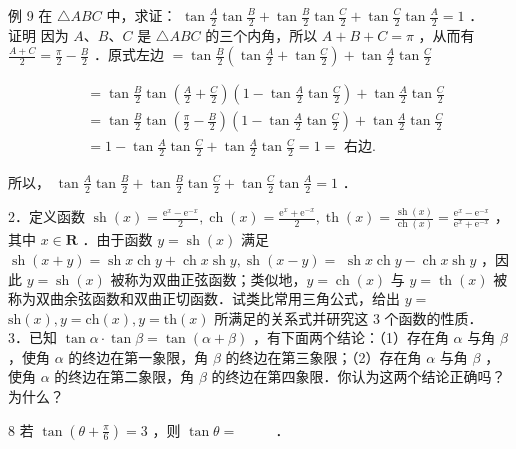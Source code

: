 \documentclass[10pt]{article}
\begin{document}
例 9 在 \(\triangle A B C\) 中，求证： \(\tan \frac{A}{2} \tan \frac{B}{2}+\tan \frac{B}{2} \tan \frac{C}{2}+\tan \frac{C}{2} \tan \frac{A}{2}=1\) ．\\
证明 因为 \(A 、 B 、 C\) 是 \(\triangle A B C\) 的三个内角，所以 \(A+B+C=\pi\) ，从而有 \(\frac{A+C}{2}=\frac{\pi}{2}-\frac{B}{2}\) ．原式左边 \(=\tan \frac{B}{2}\left(\tan \frac{A}{2}+\tan \frac{C}{2}\right)+\tan \frac{A}{2} \tan \frac{C}{2}\)

\[
\begin{aligned}
& =\tan \frac{B}{2} \tan \left(\frac{A}{2}+\frac{C}{2}\right)\left(1-\tan \frac{A}{2} \tan \frac{C}{2}\right)+\tan \frac{A}{2} \tan \frac{C}{2} \\
& =\tan \frac{B}{2} \tan \left(\frac{\pi}{2}-\frac{B}{2}\right)\left(1-\tan \frac{A}{2} \tan \frac{C}{2}\right)+\tan \frac{A}{2} \tan \frac{C}{2} \\
& =1-\tan \frac{A}{2} \tan \frac{C}{2}+\tan \frac{A}{2} \tan \frac{C}{2}=1=\text { 右边. }
\end{aligned}
\]

所以， \(\tan \frac{A}{2} \tan \frac{B}{2}+\tan \frac{B}{2} \tan \frac{C}{2}+\tan \frac{C}{2} \tan \frac{A}{2}=1\) ．

2．定义函数 \(\operatorname{sh}(x)=\frac{\mathrm{e}^{x}-\mathrm{e}^{-x}}{2}, \operatorname{ch}(x)=\frac{\mathrm{e}^{x}+\mathrm{e}^{-x}}{2}, \operatorname{th}(x)=\frac{\operatorname{sh}(x)}{\operatorname{ch}(x)}=\frac{\mathrm{e}^{x}-\mathrm{e}^{-x}}{\mathrm{e}^{x}+\mathrm{e}^{-x}}\) ，其中 \(x \in \mathbf{R}\) ．由于函数 \(y=\operatorname{sh}(x)\) 满足 \(\operatorname{sh}(x+y)=\operatorname{sh} x \operatorname{ch} y+\operatorname{ch} x \operatorname{sh} y, \operatorname{sh}(x-y)=\) \(\operatorname{sh} x \operatorname{ch} y-\operatorname{ch} x \operatorname{sh} y\) ，因此 \(y=\operatorname{sh}(x)\) 被称为双曲正弦函数；类似地，\(y=\operatorname{ch}(x)\) 与 \(y=\operatorname{th}(x)\) 被称为双曲余弦函数和双曲正切函数．试类比常用三角公式，给出 \(y=\) \(\mathrm{sh}(x), y=\mathrm{ch}(x), y=\mathrm{th}(x)\) 所满足的关系式并研究这 3 个函数的性质．\\
3．已知 \(\tan \alpha \cdot \tan \beta=\tan (\alpha+\beta)\) ，有下面两个结论：（1）存在角 \(\alpha\) 与角 \(\beta\) ，使角 \(\alpha\) 的终边在第一象限，角 \(\beta\) 的终边在第三象限；（2）存在角 \(\alpha\) 与角 \(\beta\) ，使角 \(\alpha\) 的终边在第二象限，角 \(\beta\) 的终边在第四象限．你认为这两个结论正确吗？为什么？

8 若 \(\tan \left(\theta+\frac{\pi}{6}\right)=3\) ，则 \(\tan \theta=\) \(\qquad\) ．
\end{document}
